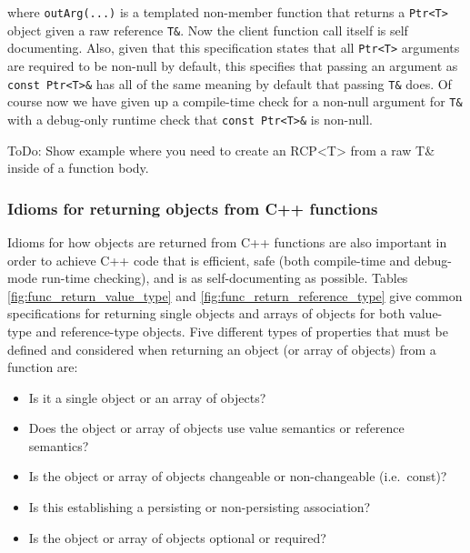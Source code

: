 \documentclass[pdf,ps2pdf,11pt]{SANDreport}
\begin{document}
where {}\texttt{outArg(...)} is a templated non-member function that
returns a {}\texttt{Ptr<T>} object given a raw reference
{}\texttt{T\&}.  Now the client function call itself is self
documenting.  Also, given that this specification states that all
{}\texttt{Ptr<T>} arguments are required to be non-null by default,
this specifies that passing an argument as {}\texttt{const Ptr<T>\&}
has all of the same meaning by default that passing {}\texttt{T\&}
does.  Of course now we have given up a compile-time check for a
non-null argument for {}\texttt{T\&} with a debug-only runtime check
that {}\texttt{const Ptr<T>\&} is non-null.

ToDo: Show example where you need to create an RCP<T> from a raw T\&
inside of a function body.


%
{}\subsubsection{Idioms for returning objects from C++ functions}
\label{sec:idioms-returning-objects}
%

Idioms for how objects are returned from C++ functions are also
important in order to achieve C++ code that is efficient, safe (both
compile-time and debug-mode run-time checking), and is as
self-documenting as possible.  Tables
{}\ref{fig:func_return_value_type} and
{}\ref{fig:func_return_reference_type} give common specifications for
returning single objects and arrays of objects for both value-type and
reference-type objects.  Five different types of properties that must
be defined and considered when returning an object (or array of
objects) from a function are:

\begin{itemize}

{}\item Is it a single object or an array of objects?

{}\item Does the object or array of objects use value semantics or
reference semantics?

{}\item Is the object or array of objects changeable or non-changeable
(i.e.\ const)?

{}\item Is this establishing a persisting or non-persisting
association?

{}\item Is the object or array of objects optional or required?

\end{itemize}
\end{document}
